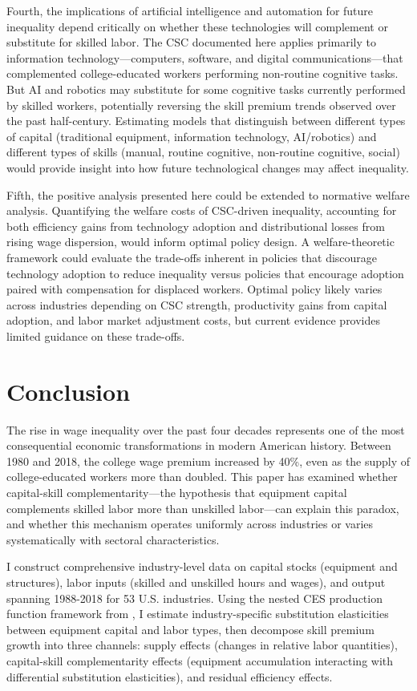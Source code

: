 \documentclass[12pt]{article}
\begin{document}
Fourth, the implications of artificial intelligence and automation for future inequality depend critically on whether these technologies will complement or substitute for skilled labor. The CSC documented here applies primarily to information technology---computers, software, and digital communications---that complemented college-educated workers performing non-routine cognitive tasks. But AI and robotics may substitute for some cognitive tasks currently performed by skilled workers, potentially reversing the skill premium trends observed over the past half-century. Estimating models that distinguish between different types of capital (traditional equipment, information technology, AI/robotics) and different types of skills (manual, routine cognitive, non-routine cognitive, social) would provide insight into how future technological changes may affect inequality.

Fifth, the positive analysis presented here could be extended to normative welfare analysis. Quantifying the welfare costs of CSC-driven inequality, accounting for both efficiency gains from technology adoption and distributional losses from rising wage dispersion, would inform optimal policy design. A welfare-theoretic framework could evaluate the trade-offs inherent in policies that discourage technology adoption to reduce inequality versus policies that encourage adoption paired with compensation for displaced workers. Optimal policy likely varies across industries depending on CSC strength, productivity gains from capital adoption, and labor market adjustment costs, but current evidence provides limited guidance on these trade-offs.

\section{Conclusion}\label{sec:conclusion}

The rise in wage inequality over the past four decades represents one of the most consequential economic transformations in modern American history. Between 1980 and 2018, the college wage premium increased by 40\%, even as the supply of college-educated workers more than doubled. This paper has examined whether capital-skill complementarity---the hypothesis that equipment capital complements skilled labor more than unskilled labor---can explain this paradox, and whether this mechanism operates uniformly across industries or varies systematically with sectoral characteristics.

I construct comprehensive industry-level data on capital stocks (equipment and structures), labor inputs (skilled and unskilled hours and wages), and output spanning 1988-2018 for 53 U.S. industries. Using the nested CES production function framework from \citet{krusell2000capital}, I estimate industry-specific substitution elasticities between equipment capital and labor types, then decompose skill premium growth into three channels: supply effects (changes in relative labor quantities), capital-skill complementarity effects (equipment accumulation interacting with differential substitution elasticities), and residual efficiency effects.
\end{document}
